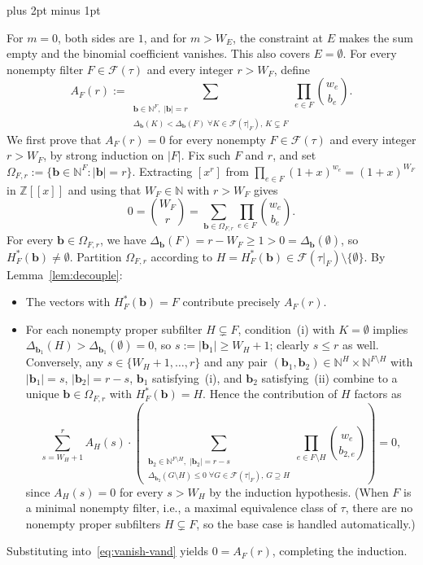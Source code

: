 \documentclass[11pt,letterpaper]{article}
\makeatletter
\renewenvironment{proof}[1][\proofname]{%
  \par\pushQED{\qed}\normalfont
  \topsep9pt plus 2pt minus 1pt\relax
  \trivlist\item[\hskip\labelsep\itshape #1\@addpunct{.}]\ignorespaces
}{\popQED\endtrivlist\@endpefalse}
\theoremstyle{result}
\theoremstyle{definition}
\theoremstyle{remark}
\newcommand{\NN}{\mathbb{N}}
\newcommand{\ZZ}{\mathbb{Z}}
\newcommand{\fF}{\mathcal{F}}
\makeatother
\begin{document}
\begin{proof}[Proof of Theorem~\ref{thm:dlv}]
For $m=0$, both sides are $1$, and for $m>W_E$, the constraint at $E$ makes the sum empty and the binomial coefficient vanishes. This also covers $E=\emptyset$. For every nonempty filter $F\in\fF(\tau)$ and every integer $r>W_F$, define
\[
A_F(r) := \sum_{\substack{\mathbf{b}\in\NN^F,\; |\mathbf{b}|=r \\ \Delta_{\mathbf{b}}(K)<\Delta_{\mathbf{b}}(F) \;\forall K\in\fF(\tau|_F),\, K\subsetneq F}} \prod_{e\in F}\binom{w_e}{b_e}.
\]
We first prove that $A_F(r)=0$ for every nonempty $F\in\fF(\tau)$ and every integer $r>W_F$, by strong induction on $|F|$. Fix such $F$ and $r$, and set $\Omega_{F,r}:=\{\mathbf{b}\in\NN^F : |\mathbf{b}|=r\}$. Extracting $[x^r]$ from $\prod_{e\in F}(1+x)^{w_e}=(1+x)^{W_F}$ in $\ZZ[[x]]$ and using that $W_F\in\NN$ with $r>W_F$ gives
\begin{equation}\label{eq:vanish-vand}
0 = \binom{W_F}{r} = \sum_{\mathbf{b}\in\Omega_{F,r}} \prod_{e\in F}\binom{w_e}{b_e}.
\end{equation}
For every $\mathbf{b}\in\Omega_{F,r}$, we have $\Delta_{\mathbf{b}}(F)=r-W_F\ge 1 > 0 = \Delta_{\mathbf{b}}(\emptyset)$, so $H^*_F(\mathbf{b})\ne\emptyset$. Partition $\Omega_{F,r}$ according to $H=H^*_F(\mathbf{b})\in\fF(\tau|_F)\setminus\{\emptyset\}$. By Lemma~\ref{lem:decouple}:
\begin{itemize}
\item The vectors with $H^*_F(\mathbf{b})=F$ contribute precisely $A_F(r)$.
\item For each nonempty proper subfilter $H\subsetneq F$, condition~(i) with $K=\emptyset$ implies $\Delta_{\mathbf{b}_1}(H)>\Delta_{\mathbf{b}_1}(\emptyset)=0$, so $s:=|\mathbf{b}_1|\ge W_H+1$; clearly $s\le r$ as well. Conversely, any $s\in\{W_H+1,\dots,r\}$ and any pair $(\mathbf{b}_1,\mathbf{b}_2)\in\NN^H\times\NN^{F\setminus H}$ with $|\mathbf{b}_1|=s$, $|\mathbf{b}_2|=r-s$, $\mathbf{b}_1$ satisfying~(i), and $\mathbf{b}_2$ satisfying~(ii) combine to a unique $\mathbf{b}\in\Omega_{F,r}$ with $H^*_F(\mathbf{b})=H$. Hence the contribution of $H$ factors as
\[
\sum_{s=W_H+1}^{r} A_H(s) \cdot \left(\sum_{\substack{\mathbf{b}_2\in\NN^{F\setminus H},\; |\mathbf{b}_2|=r-s \\ \Delta_{\mathbf{b}_2}(G\setminus H)\le 0 \;\forall G\in\fF(\tau|_F),\, G\supseteq H}} \prod_{e\in F\setminus H}\binom{w_e}{b_{2,e}}\right) = 0,
\]
since $A_H(s)=0$ for every $s>W_H$ by the induction hypothesis. (When $F$ is a minimal nonempty filter, i.e., a maximal equivalence class of $\tau$, there are no nonempty proper subfilters $H\subsetneq F$, so the base case is handled automatically.)
\end{itemize}
Substituting into~\eqref{eq:vanish-vand} yields $0=A_F(r)$, completing the induction.


\end{proof}
\end{document}
